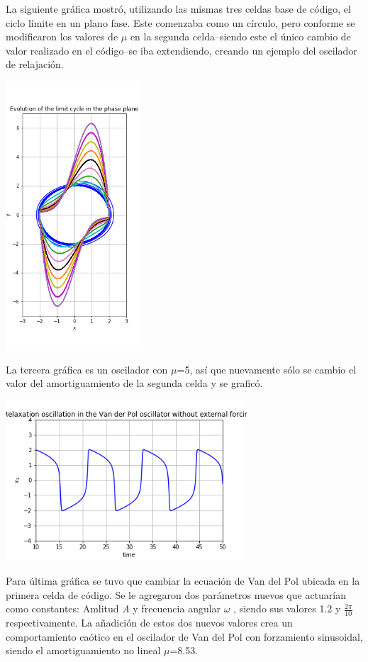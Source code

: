 \documentclass{article}
\begin{document}
La siguiente gráfica mostró, utilizando las mismas tres celdas base de código, el ciclo límite en un plano fase. Este comenzaba como un círculo, pero conforme se modificaron los valores de $\mu$ en la segunda celda--siendo este el único cambio de valor realizado en el código--se iba extendiendo, creando un ejemplo del oscilador de relajación.

	\begin{center}
    \includegraphics[height=10cm]{Image2.png}
    \end{center}
    
La tercera gráfica es un oscilador con $\mu$=5, así que nuevamente sólo se cambio el valor del amortiguamiento de la segunda celda y se graficó.

	\begin{center}
    \includegraphics[height=6cm]{Image3.png}
    \end{center}

Para última gráfica se tuvo que cambiar la ecuación de Van del Pol ubicada en la primera celda de código. Se le agregaron dos parámetros nuevos que actuarían como constantes: Amlitud \textit{A} y frecuencia angular \textit{ $\omega$ }, siendo sus valores 1.2 y $\frac{2\pi}{10}$ respectivamente. La añadición de estos dos nuevos valores crea un comportamiento caótico en el oscilador de Van del Pol con forzamiento sinusoidal, siendo el amortiguamiento no lineal $\mu$=8.53. 
\end{document}
